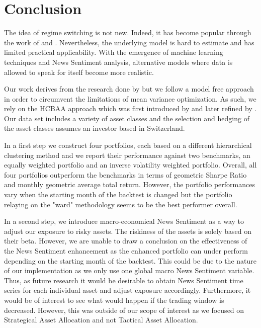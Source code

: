 \section{Conclusion}

The idea of regime switching is not new. Indeed, it has become popular through the work of \citet{ang2004regimes} and \citet{hamilton1989new}. Nevertheless, the underlying model is hard to estimate and has limited practical applicability. With the emergence of machine learning techniques and News Sentiment analysis, alternative models where data is allowed to speak for itself become more realistic.

Our work derives from the research done by \citet{enhPortOpti} but we follow a model free approach in order to circumvent the limitations of mean variance optimization. As such, we rely on the HCBAA approach which was first introduced by \citet{de2016building} and later refined by \citet{raffinot2017hierarchical}. Our data set includes a variety of asset classes and the selection and hedging of the asset classes assumes an investor based in Switzerland. 

In a first step we construct four portfolios, each based on a different hierarchical clustering method and we report their performance against two benchmarks, an equally weighted portfolio and an inverse volatility weighted portfolio. Overall, all four portfolios outperform the benchmarks in terms of geometric Sharpe Ratio and monthly geometric average total return. However, the portfolio performances vary when the starting month of the backtest is changed but the portfolio relaying on the "ward" methodology seems to be the best performer overall.

In a second step, we introduce macro-economical News Sentiment as a way to adjust our exposure to risky assets. The riskiness of the assets is solely based on their beta. However, we are unable to draw a conclusion on the effectiveness of the News Sentiment enhancement as the enhanced portfolio can under perform depending on the starting month of the backtest. This could be due to the nature of our implementation as we only use one global macro News Sentiment variable. Thus, as future research it would be desirable to obtain News Sentiment time series for each individual asset and adjust exposure accordingly. Furthermore, it would be of interest to see what would happen if the trading window is decreased. However, this was outside of our scope of interest as we focused on Strategical Asset Allocation and not Tactical Asset Allocation.



